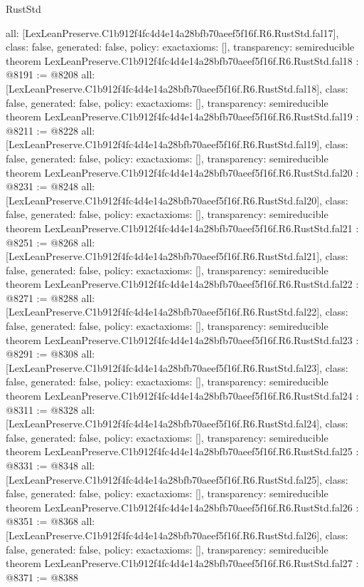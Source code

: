 \begin{lexlean}{RustStd}
\begin{coremodule}
{  all: [LexLeanPreserve.C1b912f4fc4d4e14a28bfb70aeef5f16f.R6.RustStd.fal17],
  class: false,
  generated: false,
  policy: exact{axioms: []},
  transparency: semireducible
}
theorem LexLeanPreserve.C1b912f4fc4d4e14a28bfb70aeef5f16f.R6.RustStd.fal18 : @8191 := @8208 {
  all: [LexLeanPreserve.C1b912f4fc4d4e14a28bfb70aeef5f16f.R6.RustStd.fal18],
  class: false,
  generated: false,
  policy: exact{axioms: []},
  transparency: semireducible
}
theorem LexLeanPreserve.C1b912f4fc4d4e14a28bfb70aeef5f16f.R6.RustStd.fal19 : @8211 := @8228 {
  all: [LexLeanPreserve.C1b912f4fc4d4e14a28bfb70aeef5f16f.R6.RustStd.fal19],
  class: false,
  generated: false,
  policy: exact{axioms: []},
  transparency: semireducible
}
theorem LexLeanPreserve.C1b912f4fc4d4e14a28bfb70aeef5f16f.R6.RustStd.fal20 : @8231 := @8248 {
  all: [LexLeanPreserve.C1b912f4fc4d4e14a28bfb70aeef5f16f.R6.RustStd.fal20],
  class: false,
  generated: false,
  policy: exact{axioms: []},
  transparency: semireducible
}
theorem LexLeanPreserve.C1b912f4fc4d4e14a28bfb70aeef5f16f.R6.RustStd.fal21 : @8251 := @8268 {
  all: [LexLeanPreserve.C1b912f4fc4d4e14a28bfb70aeef5f16f.R6.RustStd.fal21],
  class: false,
  generated: false,
  policy: exact{axioms: []},
  transparency: semireducible
}
theorem LexLeanPreserve.C1b912f4fc4d4e14a28bfb70aeef5f16f.R6.RustStd.fal22 : @8271 := @8288 {
  all: [LexLeanPreserve.C1b912f4fc4d4e14a28bfb70aeef5f16f.R6.RustStd.fal22],
  class: false,
  generated: false,
  policy: exact{axioms: []},
  transparency: semireducible
}
theorem LexLeanPreserve.C1b912f4fc4d4e14a28bfb70aeef5f16f.R6.RustStd.fal23 : @8291 := @8308 {
  all: [LexLeanPreserve.C1b912f4fc4d4e14a28bfb70aeef5f16f.R6.RustStd.fal23],
  class: false,
  generated: false,
  policy: exact{axioms: []},
  transparency: semireducible
}
theorem LexLeanPreserve.C1b912f4fc4d4e14a28bfb70aeef5f16f.R6.RustStd.fal24 : @8311 := @8328 {
  all: [LexLeanPreserve.C1b912f4fc4d4e14a28bfb70aeef5f16f.R6.RustStd.fal24],
  class: false,
  generated: false,
  policy: exact{axioms: []},
  transparency: semireducible
}
theorem LexLeanPreserve.C1b912f4fc4d4e14a28bfb70aeef5f16f.R6.RustStd.fal25 : @8331 := @8348 {
  all: [LexLeanPreserve.C1b912f4fc4d4e14a28bfb70aeef5f16f.R6.RustStd.fal25],
  class: false,
  generated: false,
  policy: exact{axioms: []},
  transparency: semireducible
}
theorem LexLeanPreserve.C1b912f4fc4d4e14a28bfb70aeef5f16f.R6.RustStd.fal26 : @8351 := @8368 {
  all: [LexLeanPreserve.C1b912f4fc4d4e14a28bfb70aeef5f16f.R6.RustStd.fal26],
  class: false,
  generated: false,
  policy: exact{axioms: []},
  transparency: semireducible
}
theorem LexLeanPreserve.C1b912f4fc4d4e14a28bfb70aeef5f16f.R6.RustStd.fal27 : @8371 := @8388 {
}
\end{coremodule}
\end{lexlean}
